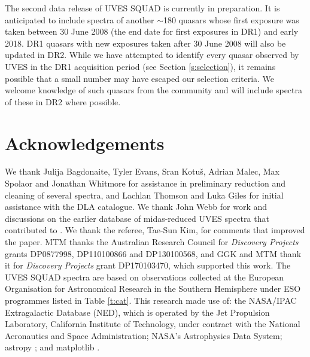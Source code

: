 \documentclass[fleqn,usenatbib,usedcolumn]{mnras}
\newcommand{\Sref}[1]{Section \ref{#1}}
\newcommand{\Tref}[1]{Table \ref{#1}}
\begin{document}
The second data release of UVES SQUAD is currently in preparation. It is anticipated to include spectra of another $\sim$180 quasars whose first exposure was taken between 30 June 2008 (the end date for first exposures in DR1) and early 2018. DR1 quasars with new exposures taken after 30 June 2008 will also be updated in DR2. While we have attempted to identify every quasar observed by UVES in the DR1 acquisition period (see \Sref{s:selection}), it remains possible that a small number may have escaped our selection criteria. We welcome knowledge of such quasars from the community and will include spectra of these in DR2 where possible.


\section*{Acknowledgements}

We thank Julija Bagdonaite, Tyler Evans, Sr\dj an Kotu\v{s}, Adrian Malec, Max Spolaor and Jonathan Whitmore for assistance in preliminary reduction and cleaning of several spectra, and Lachlan Thomson and Luka Giles for initial assistance with the DLA catalogue. We thank John Webb for work and discussions on the earlier database of {\sc midas}-reduced UVES spectra that contributed to \citet{King:2012:3370}. We thank the referee, Tae-Sun Kim, for comments that improved the paper. MTM thanks the Australian Research Council for \textsl{Discovery Projects} grants DP0877998, DP110100866 and DP130100568, and GGK and MTM thank it for \textsl{Discovery Projects} grant DP170103470, which supported this work. The UVES SQUAD spectra are based on observations collected at the European Organisation for Astronomical Research in the Southern Hemisphere under ESO programmes listed in \Tref{t:cat}. This research made use of: the NASA/IPAC Extragalactic Database (NED), which is operated by the Jet Propulsion Laboratory, California Institute of Technology, under contract with the National Aeronautics and Space Administration; NASA's Astrophysics Data System; {\sc astropy} \citep{Astropy:2013:A33}; and {\sc matplotlib} \citep{Hunter:2007:90}.









\end{document}
